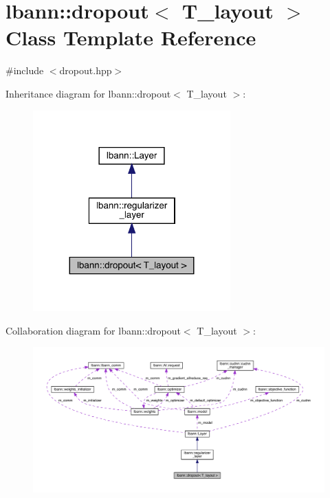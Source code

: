 \hypertarget{classlbann_1_1dropout}{}\section{lbann\+:\+:dropout$<$ T\+\_\+layout $>$ Class Template Reference}
\label{classlbann_1_1dropout}


{\ttfamily \#include $<$dropout.\+hpp$>$}



Inheritance diagram for lbann\+:\+:dropout$<$ T\+\_\+layout $>$\+:\nopagebreak
\begin{figure}[H]
\begin{center}
\leavevmode
\includegraphics[width=215pt]{classlbann_1_1dropout__inherit__graph}
\end{center}
\end{figure}


Collaboration diagram for lbann\+:\+:dropout$<$ T\+\_\+layout $>$\+:\nopagebreak
\begin{figure}[H]
\begin{center}
\leavevmode
\includegraphics[width=350pt]{classlbann_1_1dropout__coll__graph}
\end{center}
\end{figure}
